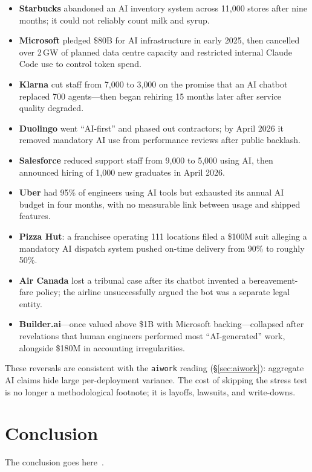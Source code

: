 \documentclass[10pt,conference]{IEEEtran}
\begin{document}
\begin{itemize}\itemsep0pt
  \item \textbf{Starbucks} abandoned an AI inventory system across
        11{,}000 stores after nine months; it could not reliably
        count milk and syrup.
  \item \textbf{Microsoft} pledged \$80B for AI infrastructure
        in early 2025, then cancelled over 2\,GW of planned data
        centre capacity and restricted internal Claude Code use
        to control token spend.
  \item \textbf{Klarna} cut staff from 7{,}000 to 3{,}000 on the
        promise that an AI chatbot replaced 700 agents---then
        began rehiring 15 months later after service quality
        degraded.
  \item \textbf{Duolingo} went ``AI-first'' and phased out
        contractors; by April 2026 it removed mandatory AI use
        from performance reviews after public backlash.
  \item \textbf{Salesforce} reduced support staff from 9{,}000 to
        5{,}000 using AI, then announced hiring of 1{,}000 new
        graduates in April 2026.
  \item \textbf{Uber} had 95\% of engineers using AI tools but
        exhausted its annual AI budget in four months, with no
        measurable link between usage and shipped features.
  \item \textbf{Pizza Hut}: a franchisee operating 111 locations
        filed a \$100M suit alleging a mandatory AI dispatch
        system pushed on-time delivery from 90\% to roughly 50\%.
  \item \textbf{Air Canada} lost a tribunal case after its
        chatbot invented a bereavement-fare policy; the airline
        unsuccessfully argued the bot was a separate legal entity.
  \item \textbf{Builder.ai}---once valued above \$1B with
        Microsoft backing---collapsed after revelations that human
        engineers performed most ``AI-generated'' work, alongside
        \$180M in accounting irregularities.
\end{itemize}

These reversals are consistent with the \texttt{aiwork} reading
(\S\ref{sec:aiwork}): aggregate AI claims hide large per-deployment
variance. The cost of skipping the stress test is no longer a
methodological footnote; it is layoffs, lawsuits, and write-downs.

\section{Conclusion}
The conclusion goes here~\cite{eken2021deployment}.

 


\end{document}
